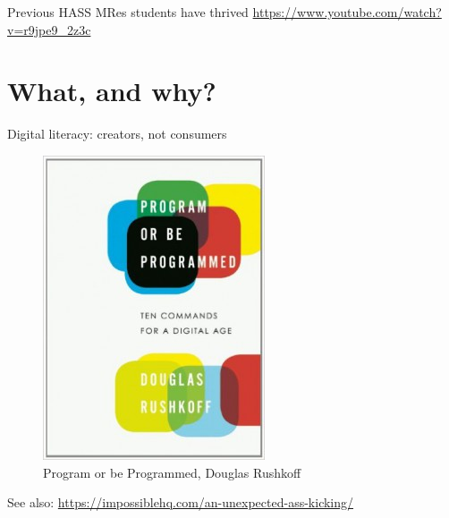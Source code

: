 \documentclass[aspectratio=169, 11pt]{beamer} %
\begin{document}
\begin{frame}{Previous HASS MRes students have thrived}
  \url{https://www.youtube.com/watch?v=r9jpe9_2z3c}
\end{frame}

\section{What, and why?}

\begin{frame}{Digital literacy: creators, not consumers}
    \begin{figure}[H]
        \centering
        \includegraphics[height=.6\textheight]{figures/2011-ProgOrBeProgged-248x340.jpg}
        \caption{Program or be Programmed, Douglas Rushkoff}
        \label{fig:programmed}
    \end{figure}
  
  See also: \url{https://impossiblehq.com/an-unexpected-ass-kicking/}

\end{frame}
\end{document}

